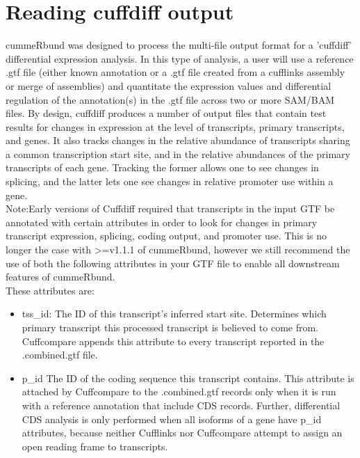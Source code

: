 \documentclass[10pt]{article}
\newcommand{\Rpackage}[1]{\textsf{#1}}
\begin{document}
\section{Reading cuffdiff output}
\Rpackage{cummeRbund} was designed to process the multi-file output format for a 'cuffdiff' differential expression analysis.  In this type of analysis, a user will use a reference .gtf file (either known annotation or a .gtf file created from a cufflinks assembly or merge of assemblies) and quantitate the expression values and differential regulation of the annotation(s) in the .gtf file across two or more SAM/BAM files.
By design, cuffdiff produces a number of output files that contain test results for changes in expression at the level of transcripts, primary transcripts, and genes. It also tracks changes in the relative abundance of transcripts sharing a common transcription start site, and in the relative abundances of the primary transcripts of each gene. Tracking the former allows one to see changes in splicing, and the latter lets one see changes in relative promoter use within a gene. \\

Note:Early versions of Cuffdiff required that transcripts in the input GTF be annotated with certain attributes in order to look for changes in primary transcript expression, splicing, coding output, and promoter use. This is no longer the case with >=v1.1.1 of \Rpackage{cummeRbund}, however we still recommend the use of both the following attributes in your GTF file to enable all downstream features of \Rpackage{cummeRbund}. \\

These attributes are:
\begin{itemize}
	\item tss\_id: The ID of this transcript's inferred start site. Determines which primary transcript this processed transcript is believed to come from. Cuffcompare appends this attribute to every transcript reported in the .combined.gtf file.
	\item p\_id	The ID of the coding sequence this transcript contains. This attribute is attached by Cuffcompare to the .combined.gtf records only when it is run with a reference annotation that include CDS records. Further, differential CDS analysis is only performed when all isoforms of a gene have p\_id attributes, because neither Cufflinks nor Cuffcompare attempt to assign an open reading frame to transcripts.
\end{itemize}
\end{document}
